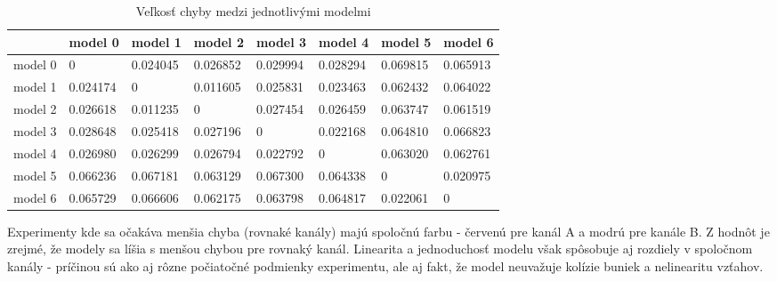 \documentclass[10pt,a4paper]{article}
\begin{document}
\begin{table}[ht]
\centering
\caption{Veľkosť chyby medzi jednotlivými modelmi}
\label{tab:model_errors}
\begin{tabular}{|l|l|l|l|l|l|l|l|}
\hline
        & model 0                         & model 1                         & model 2                         & model 3                         & model 4                         & model 5                         & model 6                         \\ \hline
model 0 & {\color[HTML]{FE0000} 0}        & {\color[HTML]{FE0000} 0.024045} & {\color[HTML]{FE0000} 0.026852} & {\color[HTML]{FE0000} 0.029994} & {\color[HTML]{FE0000} 0.028294} &  0.069815 &  0.065913 \\ \hline
model 1 & {\color[HTML]{FE0000} 0.024174} & {\color[HTML]{FE0000} 0}        & {\color[HTML]{FE0000} 0.011605} & {\color[HTML]{FE0000} 0.025831} & {\color[HTML]{FE0000} 0.023463} &  0.062432 &  0.064022 \\ \hline
model 2 & {\color[HTML]{FE0000} 0.026618} & {\color[HTML]{FE0000} 0.011235} & {\color[HTML]{FE0000} 0}        & {\color[HTML]{FE0000} 0.027454} & {\color[HTML]{FE0000} 0.026459} &  0.063747 &  0.061519 \\ \hline
model 3 & {\color[HTML]{FE0000} 0.028648} & {\color[HTML]{FE0000} 0.025418} & {\color[HTML]{FE0000} 0.027196} & {\color[HTML]{FE0000} 0}        & {\color[HTML]{FE0000} 0.022168} &  0.064810 &  0.066823 \\ \hline
model 4 & {\color[HTML]{FE0000} 0.026980} & {\color[HTML]{FE0000} 0.026299} & {\color[HTML]{FE0000} 0.026794} & {\color[HTML]{FE0000} 0.022792} & {\color[HTML]{FE0000} 0}        &  0.063020 &  0.062761 \\ \hline
model 5 &  0.066236 &  0.067181 &  0.063129 &  0.067300 &  0.064338 & {\color[HTML]{3531FF} 0} & {\color[HTML]{3531FF} 0.020975} \\ \hline
model 6 &  0.065729 &  0.066606 &  0.062175 &  0.063798 &  0.064817 & {\color[HTML]{3531FF} 0.022061} & {\color[HTML]{3531FF} 0} \\ \hline
\end{tabular}
\end{table}

Experimenty kde sa očakáva menšia chyba (rovnaké kanály) majú spoločnú farbu - červenú pre kanál A a modrú pre kanále B.
Z hodnôt je zrejmé, že modely sa líšia s menšou chybou pre rovnaký kanál. Linearita a jednoduchosť
modelu však spôsobuje aj rozdiely v spoločnom kanály - príčinou sú ako aj rôzne počiatočné podmienky experimentu,
ale aj fakt, že model neuvažuje kolízie buniek a nelinearitu vzťahov.
\end{document}
